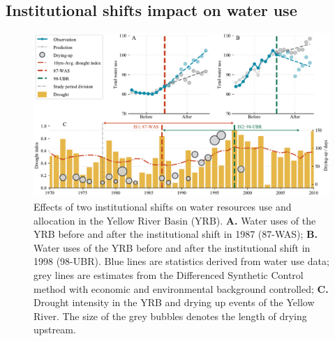 \documentclass[preprint, 12pt]{elsarticle}
\providecommand{\DIFaddbegin}{} %
\providecommand{\DIFaddend}{} %
\begin{document}
\DIFaddbegin


\DIFaddend \subsection{Institutional shifts impact on water use}\label{result-2}

\begin{figure}[!htb]
	\centering
	\includegraphics[width=0.9\linewidth]{outputs/main_results2.pdf}
	\caption{
	Effects of two institutional shifts on water resources use and allocation in the Yellow River Basin (YRB).
	\textbf{A.} Water uses of the YRB before and after the institutional shift in 1987 (87-WAS);
	\textbf{B.} Water uses of the YRB before and after the institutional shift in 1998 (98-UBR). Blue lines are statistics derived from water use data; grey lines are estimates from the Differenced Synthetic Control method with economic and environmental background controlled;
	\textbf{C.} Drought intensity in the YRB and drying up events of the Yellow River. The size of the grey bubbles denotes the length of drying upstream.
	}\label{fig:main_results}
\end{figure}
\end{document}
